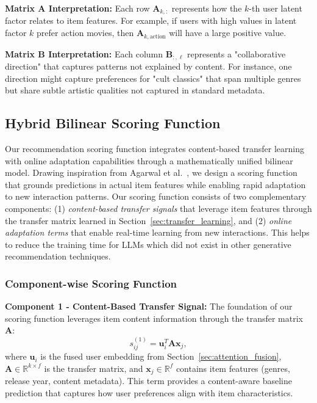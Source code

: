 \documentclass[acmsmall]{acmart}
\begin{document}
\textbf{Matrix A Interpretation:} Each row $\mathbf{A}_{k,:}$ represents how the $k$-th user latent factor relates to item features. For example, if users with high values in latent factor $k$ prefer action movies, then $\mathbf{A}_{k,\text{action}}$ will have a large positive value.

\textbf{Matrix B Interpretation:} Each column $\mathbf{B}_{:,\ell}$ represents a "collaborative direction" that captures patterns not explained by content. For instance, one direction might capture preferences for "cult classics" that span multiple genres but share subtle artistic qualities not captured in standard metadata.

\subsection{Hybrid Bilinear Scoring Function}
\label{sec:bilinear_scoring}

Our recommendation scoring function integrates content-based transfer learning with online adaptation capabilities through a mathematically unified bilinear model. Drawing inspiration from Agarwal et al.~\cite{agarwal2010fast}, we design a scoring function that grounds predictions in actual item features while enabling rapid adaptation to new interaction patterns.
 Our scoring function consists of two complementary components: (1) \textit{content-based transfer signals} that leverage item features through the transfer matrix learned in Section~\ref{sec:transfer_learning}, and (2) \textit{online adaptation terms} that enable real-time learning from new interactions. This helps to reduce the training time for LLMs which did not exist in other generative recommendation techniques.

\subsubsection{Component-wise Scoring Function}

\textbf{Component 1 - Content-Based Transfer Signal:} The foundation of our scoring function leverages item content information through the transfer matrix $\mathbf{A}$:
\begin{equation}
s^{(1)}_{ij} = \mathbf{u}_i^T \mathbf{A} \mathbf{x}_j,
\label{eq:transfer_component}
\end{equation}
where $\mathbf{u}_i$ is the fused user embedding from Section~\ref{sec:attention_fusion}, $\mathbf{A} \in \mathbb{R}^{k \times f}$ is the transfer matrix, and $\mathbf{x}_j \in \mathbb{R}^f$ contains item features (genres, release year, content metadata). This term provides a content-aware baseline prediction that captures how user preferences align with item characteristics.
\end{document}
